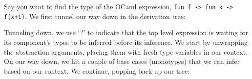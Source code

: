 \begin{Example}

    \noindent 
    Say you want to find the type of the OCaml expression, \texttt{fun f -> fun x -> f(x+1)}. We first tunnel our way down in the 
    derivation tree:\\ 
    
    \noindent
    \Large
    \normalsize
    
    \vspace{1em}
    \noindent
    Tunneling down, we use `?' to indicate that the top level expression is waiting for its component's types to be inferred before its inference. We 
    start by unwrapping the abstraction arguments, placing them with fresh type variables in our context. On our way down, we hit a couple of base 
    cases (monotypes) that we can infer based on our context. We continue, popping back up our tree:\\
    
    
    \Large
    \normalsize


\end{Example}
